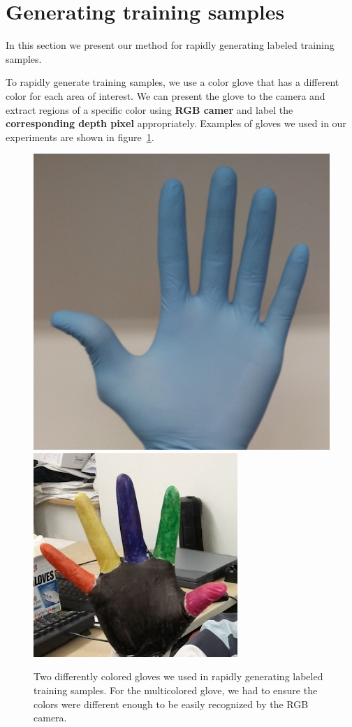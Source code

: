 \section{Generating training samples}
\label{sec: generating_training}

In this section we present our method for rapidly generating labeled training samples.

To rapidly generate training samples, we use a color glove that has a different color for each area of interest. We can present the glove to the camera and extract regions of a specific color using \textbf{RGB camer} and label the \textbf{corresponding depth pixel} appropriately. Examples of gloves we used in our experiments are shown in figure~\ref{fig:gloves}.

\begin{figure}
\begin{center}
\includegraphics[width=0.23 \textwidth]{fig/blueglove.png}
\includegraphics[width=0.23 \textwidth]{fig/colorglove.png}
\end{center}
\caption{Two differently colored gloves we used in rapidly generating labeled training samples. For the multicolored glove, we had to ensure the colors were different enough to be easily recognized by the RGB camera.}
\label{fig:gloves}
\end{figure}

